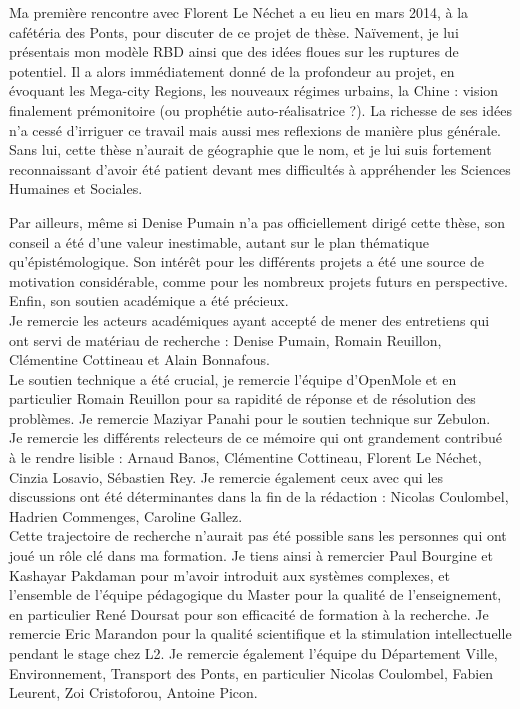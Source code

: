 Ma première rencontre avec Florent Le Néchet a eu lieu en mars 2014, à la cafétéria des Ponts, pour discuter de ce projet de thèse. Naïvement, je lui présentais mon modèle RBD ainsi que des idées floues sur les ruptures de potentiel. Il a alors immédiatement donné de la profondeur au projet, en évoquant les Mega-city Regions, les nouveaux régimes urbains, la Chine : vision finalement prémonitoire (ou prophétie auto-réalisatrice ?). La richesse de ses idées n'a cessé d'irriguer ce travail mais aussi mes reflexions de manière plus générale. Sans lui, cette thèse n'aurait de géographie que le nom, et je lui suis fortement reconnaissant d'avoir été patient devant mes difficultés à appréhender les Sciences Humaines et Sociales.

Par ailleurs, même si Denise Pumain n'a pas officiellement dirigé cette thèse, son conseil a été d'une valeur inestimable, autant sur le plan thématique qu'épistémologique. Son intérêt pour les différents projets a été une source de motivation considérable, comme pour les nombreux projets futurs en perspective. Enfin, son soutien académique a été précieux.
\\


Je remercie les acteurs académiques ayant accepté de mener des entretiens qui ont servi de matériau de recherche : Denise Pumain, Romain Reuillon, Clémentine Cottineau et Alain Bonnafous.\\


Le soutien technique a été crucial, je remercie l'équipe d'OpenMole et en particulier Romain Reuillon pour sa rapidité de réponse et de résolution des problèmes. Je remercie Maziyar Panahi pour le soutien technique sur Zebulon.\\

Je remercie les différents relecteurs de ce mémoire qui ont grandement contribué à le rendre lisible : Arnaud Banos, Clémentine Cottineau, Florent Le Néchet, Cinzia Losavio, Sébastien Rey. Je remercie également ceux avec qui les discussions ont été déterminantes dans la fin de la rédaction : Nicolas Coulombel, Hadrien Commenges, Caroline Gallez.\\



Cette trajectoire de recherche n'aurait pas été possible sans les personnes qui ont joué un rôle clé dans ma formation. Je tiens ainsi à remercier Paul Bourgine et Kashayar Pakdaman pour m'avoir introduit aux systèmes complexes, et l'ensemble de l'équipe pédagogique du Master pour la qualité de l'enseignement, en particulier René Doursat pour son efficacité de formation à la recherche. Je remercie Eric Marandon pour la qualité scientifique et la stimulation intellectuelle pendant le stage chez L2. Je remercie également l'équipe du Département Ville, Environnement, Transport des Ponts, en particulier Nicolas Coulombel, Fabien Leurent, Zoi Cristoforou, Antoine Picon. %


